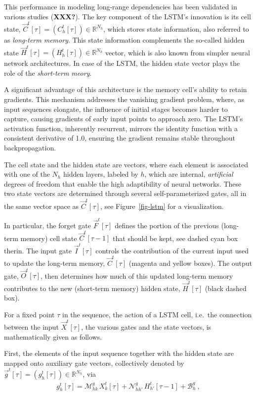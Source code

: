 \documentclass[
]{agujournal2019}
\begin{document}
This performance in modeling long-range dependencies has been validated
in various studies (\textbf{XXX?}). The key component of the LSTM's
innovation is its cell state,
\(\vec{C}^t[\tau] = (C^t_h[\tau]) \in \mathbb{R}^{N_h}\), which stores
state information, also referred to as \emph{long-term memory}. This
state information complements the so-called hidden state
\(\vec{H}^t[\tau] = (H^t_h[\tau]) \in \mathbb{R}^{N_h}\) vector, which
is also known from simpler neural network architectures. In case of the
LSTM, the hidden state vector plays the role of the \emph{short-term
meory}.

A significant advantage of this architecture is the memory cell's
ability to retain gradients. This mechanism addresses the vanishing
gradient problem, where, as input sequences elongate, the influence of
initial stages becomes harder to capture, causing gradients of early
input points to approach zero. The LSTM's activation function,
inherently recurrent, mirrors the identity function with a consistent
derivative of 1.0, ensuring the gradient remains stable throughout
backpropagation.

The cell state and the hidden state are vectors, where each element is
associated with one of the \(N_h\) hidden layers, labeled by \(h\),
which are internal, \emph{artificial} degrees of freedom that enable the
high adaptibility of neural networks. These two state vectors are
determined through several self-parameterized gates, all in the same
vector space as \(\vec{C}^t[\tau]\), see Figure~\ref{fig-lstm} for a
visualization.

In particular, the forget gate \(\vec{F}^t[\tau]\) defines the portion
of the previous (long-term memory) cell state \(\vec{C}^t[\tau-1]\) that
should be kept, see dashed cyan box therin\hspace{0pt}. The input gate
\(\vec{I}^t[\tau]\) controls the contribution of the current input used
to update the long-term memory, \(\vec{C}^t[\tau]\) (magenta and yellow
boxes). The output gate, \(\vec{O}^t[\tau]\), then determines how much
of this updated long-term memory contributes to the new (short-term
memory) hidden state, \(\vec{H}^t[\tau]\) (black dashed box).

For a fixed point \(\tau\) in the sequence, the action of a LSTM cell,
i.e.~the connection between the input \(\vec{X}^t[\tau]\), the various
gates and the state vectors, is mathematically given as follows.

First, the elements of the input sequence together with the hidden state
are mapped onto auxiliary gate vectors, collectively denoted by
\(\vec{g}^t[\tau] = (g^t_h[\tau]) \in \mathbb{R}^{N_h}\), via \[
\begin{aligned}
g_h^t[\tau] =  \mathcal{M}^{g}_{hk} \, X^t_k[\tau] +  \mathcal{N}^{g}_{hh'} \, H^t_{h'}[\tau-1] + \mathcal{B}^g_{h} \ ,
\end{aligned}
\]
\end{document}

